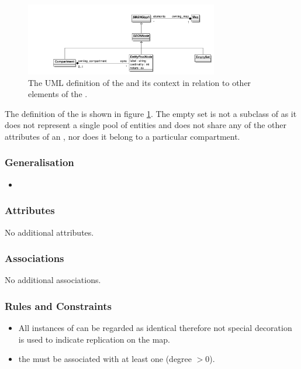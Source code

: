 \begin{figure}[htb]
  \centering
  \includegraphics[width=0.75\textwidth]{images/emptysetuml}
  \caption{The UML definition of the  and its context
    in relation to other elements of the \PDl.}
  \label{fig:emptysetuml}
\end{figure}

The definition of the  is shown in figure
\ref{fig:emptysetuml}. The empty set is not a subclass of  as it does not
represent a single pool of entities and does not share any of the
other attributes of an , nor does it belong to a particular
compartment.

\subsubsection{Generalisation}

\begin{itemize}
\item {}
\end{itemize}

\subsubsection{Attributes}

No additional attributes.

\subsubsection{Associations}

No additional associations.

\subsubsection{Rules and Constraints}

\begin{itemize}
\item  All instances of  can be regarded as identical
therefore not special decoration is used to indicate replication on
the map.
\item the  must be associated with at least
  one  (degree $> 0$).
\end{itemize}


